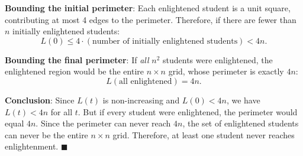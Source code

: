\documentclass[11pt]{article}
\begin{document}
\textbf{Bounding the initial perimeter}: Each enlightened student is a unit square,
contributing at most 4 edges to the perimeter. Therefore, if there are fewer than $n$
initially enlightened students:
\[
    L(0) \leq 4 \cdot (\text{number of initially enlightened students}) < 4n.
\]

\textbf{Bounding the final perimeter}: If \textit{all} $n^2$ students were
enlightened, the enlightened region would be the entire $n \times n$ grid, whose
perimeter is exactly $4n$:
\[
    L(\text{all enlightened}) = 4n.
\]

\textbf{Conclusion}: Since $L(t)$ is non-increasing and $L(0) < 4n$, we have
$L(t) < 4n$ for all $t$. But if every student were enlightened, the perimeter would
equal $4n$. Since the perimeter can never reach $4n$, the set of enlightened students
can never be the entire $n \times n$ grid. Therefore, at least one student never
reaches enlightenment. $\blacksquare$
\end{document}

